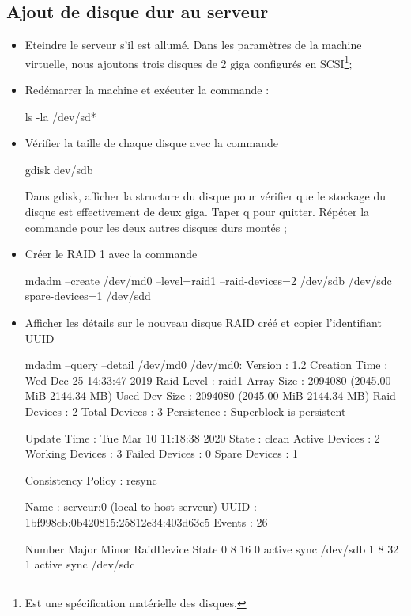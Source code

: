 \documentclass[a4paper,12pt,french]{report} %
\begin{document}
\subsection{Ajout de disque dur au serveur}	
\begin{itemize}
	\item Eteindre le serveur s'il est allumé. Dans les paramètres de la machine virtuelle, nous ajoutons trois disques de 2 giga configurés en SCSI\footnote{Est une spécification matérielle des disques.};
	\item Redémarrer la machine et exécuter la commande :
	\begin{exempleConsole}
		ls -la /dev/sd* 
	\end{exempleConsole}
	\item Vérifier la taille de chaque disque avec la commande
	\begin{exempleConsole}
	gdisk dev/sdb
	\end{exempleConsole}
	Dans gdisk, afficher la structure du disque pour vérifier que le stockage du disque est effectivement de deux giga. Taper q  pour quitter. Répéter la commande pour  les deux autres disques durs montés ;
 	\item Créer le RAID 1 avec la commande  
	\begin{exempleConsole}
	mdadm --create /dev/md0 --level=raid1 --raid-devices=2 /dev/sdb /dev/sdc spare-devices=1 /dev/sdd
	\end{exempleConsole}
	\item Afficher les détails sur le nouveau disque RAID créé et copier l'identifiant UUID
	\begin{exempleConsole}
		mdadm --query --detail /dev/md0
		/dev/md0:
				   Version : 1.2
			 Creation Time : Wed Dec 25 14:33:47 2019
				Raid Level : raid1
				Array Size : 2094080 (2045.00 MiB 2144.34 MB)
			 Used Dev Size : 2094080 (2045.00 MiB 2144.34 MB)
			  Raid Devices : 2
			 Total Devices : 3
			   Persistence : Superblock is persistent
		
			   Update Time : Tue Mar 10 11:18:38 2020
					 State : clean
			Active Devices : 2
		   Working Devices : 3
			Failed Devices : 0
			 Spare Devices : 1
		
		Consistency Policy : resync
		
					  Name : serveur:0  (local to host serveur)
					  UUID : 1bf998cb:0b420815:25812e34:403d63c5
					Events : 26
		
			Number   Major   Minor   RaidDevice State
			   0       8       16        0      active sync   /dev/sdb
			   1       8       32        1      active sync   /dev/sdc
		

\end{exempleConsole}
\end{itemize}
\end{document}
